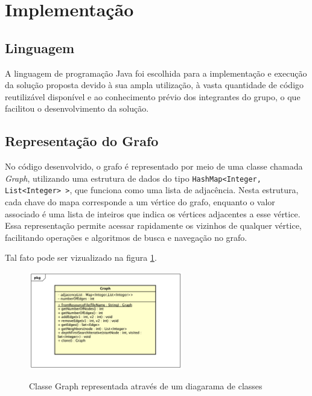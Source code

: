 \section{\esp Implementação}


\subsection{\esp Linguagem}
A linguagem de programação Java foi escolhida para a implementação e execução da solução proposta devido à sua ampla utilização, à vasta quantidade de código reutilizável disponível e ao conhecimento prévio dos integrantes do grupo, o que facilitou o desenvolvimento da solução.

\subsection{\esp Representação do Grafo}
No código desenvolvido, o grafo é representado por meio de uma classe chamada \textit{Graph}, utilizando uma estrutura de dados do tipo \texttt{HashMap<Integer, List<Integer> >}, que funciona como uma lista de adjacência. Nesta estrutura, cada chave do mapa corresponde a um vértice do grafo, enquanto o valor associado é uma lista de inteiros que indica os vértices adjacentes a esse vértice. Essa representação permite acessar rapidamente os vizinhos de qualquer vértice, facilitando operações e algoritmos de busca e navegação no grafo.


 Tal fato pode ser vizualizado na figura \ref{fig:figura1}. 
\begin{figure}[ht]
	\centering	
	\caption[\hspace{0.1cm}Grafo.]{Classe Graph representada através de um diagarama de classes}
	\vspace{-0.4cm}
	\includegraphics[width=0.6\textwidth]{figuras/graph-class.png}
	 \vspace{-0.2cm}
	\label{fig:figura1}
\end{figure}
\vspace{-0.5cm}

